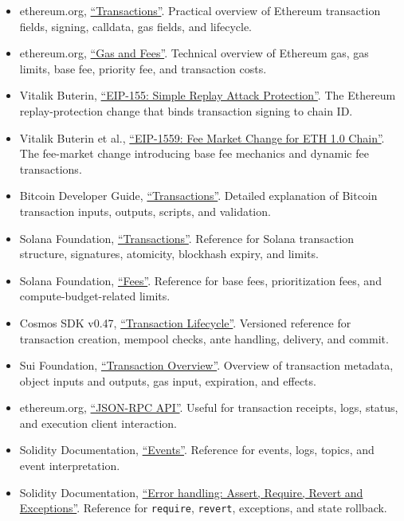 \begin{itemize}
\tightlist
\item
  ethereum.org,
  \href{https://ethereum.org/developers/docs/transactions/}{``Transactions''}.
  Practical overview of Ethereum transaction fields, signing, calldata,
  gas fields, and lifecycle.
\item
  ethereum.org, \href{https://ethereum.org/developers/docs/gas/}{``Gas
  and Fees''}. Technical overview of Ethereum gas, gas limits, base fee,
  priority fee, and transaction costs.
\item
  Vitalik Buterin,
  \href{https://eips.ethereum.org/EIPS/eip-155}{``EIP-155: Simple Replay
  Attack Protection''}. The Ethereum replay-protection change that binds
  transaction signing to chain ID.
\item
  Vitalik Buterin et al.,
  \href{https://eips.ethereum.org/EIPS/eip-1559}{``EIP-1559: Fee Market
  Change for ETH 1.0 Chain''}. The fee-market change introducing base
  fee mechanics and dynamic fee transactions.
\item
  Bitcoin Developer Guide,
  \href{https://developer.bitcoin.org/devguide/transactions.html}{``Transactions''}.
  Detailed explanation of Bitcoin transaction inputs, outputs, scripts,
  and validation.
\item
  Solana Foundation,
  \href{https://solana.com/docs/core/transactions}{``Transactions''}.
  Reference for Solana transaction structure, signatures, atomicity,
  blockhash expiry, and limits.
\item
  Solana Foundation, \href{https://solana.com/docs/core/fees}{``Fees''}.
  Reference for base fees, prioritization fees, and
  compute-budget-related limits.
\item
  Cosmos SDK v0.47,
  \href{https://docs.cosmos.network/sdk/v0.47/learn/beginner/tx-lifecycle}{``Transaction
  Lifecycle''}. Versioned reference for transaction creation, mempool
  checks, ante handling, delivery, and commit.
\item
  Sui Foundation,
  \href{https://docs.sui.io/develop/transactions/txn-overview}{``Transaction
  Overview''}. Overview of transaction metadata, object inputs and
  outputs, gas input, expiration, and effects.
\item
  ethereum.org,
  \href{https://ethereum.org/developers/docs/apis/json-rpc/}{``JSON-RPC
  API''}. Useful for transaction receipts, logs, status, and execution
  client interaction.
\item
  Solidity Documentation,
  \href{https://docs.soliditylang.org/en/latest/contracts.html\#events}{``Events''}.
  Reference for events, logs, topics, and event interpretation.
\item
  Solidity Documentation,
  \href{https://docs.soliditylang.org/en/latest/control-structures.html\#error-handling-assert-require-revert-and-exceptions}{``Error
  handling: Assert, Require, Revert and Exceptions''}. Reference for
  \passthrough{\lstinline!require!}, \passthrough{\lstinline!revert!},
  exceptions, and state rollback.
\end{itemize}
